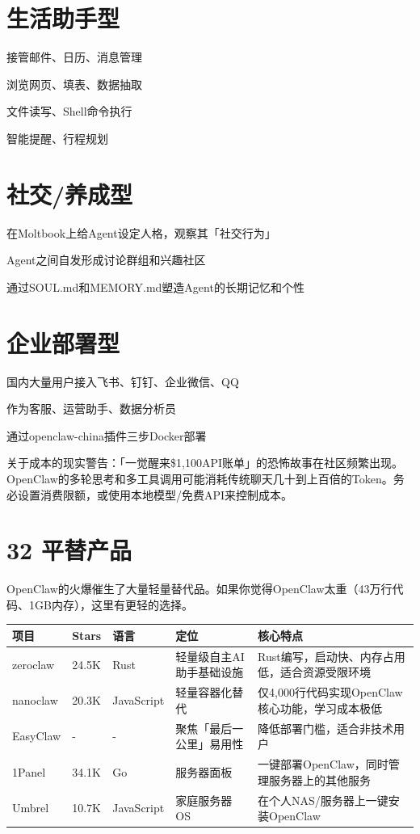 \documentclass[
  10
]{article}
\newcounter{none} %
\begin{document}
\section{生活助手型}\label{ux751fux6d3bux52a9ux624bux578b-1}

接管邮件、日历、消息管理

浏览网页、填表、数据抽取

文件读写、Shell命令执行

智能提醒、行程规划

\section{社交/养成型}\label{ux793eux4ea4ux517bux6210ux578b-1}

在Moltbook上给Agent设定人格，观察其「社交行为」

Agent之间自发形成讨论群组和兴趣社区

通过SOUL.md和MEMORY.md塑造Agent的长期记忆和个性

\section{企业部署型}\label{ux4f01ux4e1aux90e8ux7f72ux578b-1}

国内大量用户接入飞书、钉钉、企业微信、QQ

作为客服、运营助手、数据分析员

通过openclaw-china插件三步Docker部署

关于成本的现实警告：「一觉醒来\$1,100API账单」的恐怖故事在社区频繁出现。OpenClaw的多轮思考和多工具调用可能消耗传统聊天几十到上百倍的Token。务必设置消费限额，或使用本地模型/免费API来控制成本。

\section{32 平替产品}\label{ux5e73ux66ffux4ea7ux54c1}

OpenClaw的火爆催生了大量轻量替代品。如果你觉得OpenClaw太重（43万行代码、1GB内存），这里有更轻的选择。

{\def\LTcaptype{none} %
\begin{longtable}[]{@{}|l|l|l|l|l|@{}}
\toprule\noalign{}
\endhead
\bottomrule\noalign{}
\endlastfoot
\hline
项目 & Stars & 语言 & 定位 & 核心特点 \\
\hline
zeroclaw & 24.5K & Rust & 轻量级自主AI助手基础设施 &
Rust编写，启动快、内存占用低，适合资源受限环境 \\
\hline
nanoclaw & 20.3K & JavaScript & 轻量容器化替代 &
仅4,000行代码实现OpenClaw核心功能，学习成本极低 \\
\hline
EasyClaw & - & - & 聚焦「最后一公里」易用性 &
降低部署门槛，适合非技术用户 \\
\hline
1Panel & 34.1K & Go & 服务器面板 &
一键部署OpenClaw，同时管理服务器上的其他服务 \\
\hline
Umbrel & 10.7K & JavaScript & 家庭服务器OS &
在个人NAS/服务器上一键安装OpenClaw \\
\hline
\end{longtable}
}
\end{document}
